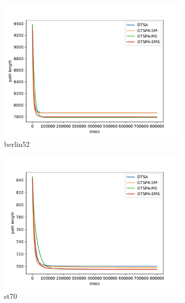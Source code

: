 \documentclass[12pt]{article}
\theoremstyle{plain}
\theoremstyle{definition}
\theoremstyle{remark}
\begin{document}
\begin{figure}[h]
	\centering
	\begin{subfigure}{.5\textwidth}
		\centering
		\includegraphics[width=\textwidth]{../../Implementation/gen/mean_convergence_berlin52}
		\caption{berlin52}
	\end{subfigure}%
	\begin{subfigure}{.5\textwidth}
		\centering
		\includegraphics[width=\textwidth]{../../Implementation/gen/mean_convergence_st70}
		\caption{st70}
	\end{subfigure}
	\begin{subfigure}{.5\textwidth}
		\centering

\end{subfigure}
\end{figure}
\end{document}
